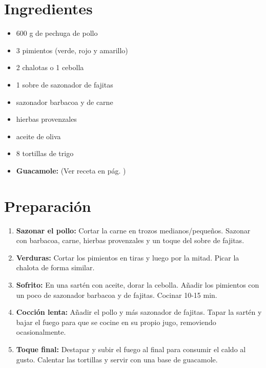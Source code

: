     
    \begin{minipage}[t]{0.35\textwidth}
        \section*{Ingredientes}
        \begin{itemize}[leftmargin=*]
            \raggedright
            \item 600 g de pechuga de pollo
            \item 3 pimientos (verde, rojo y amarillo)
            \item 2 chalotas o 1 cebolla
            \item 1 sobre de sazonador de fajitas
            \item sazonador barbacoa y de carne
            \item hierbas provenzales
            \item aceite de oliva
            \item 8 tortillas de trigo
            \item \textbf{Guacamole:} (Ver receta en pág. \pageref{receta:guacamole})
        \end{itemize}
    \end{minipage}
    \hfill
    \begin{minipage}[t]{0.6\textwidth}
        \section*{Preparación}
        \begin{enumerate}
            \item \textbf{Sazonar el pollo:} Cortar la carne en trozos medianos/pequeños. Sazonar con barbacoa, carne, hierbas provenzales y un toque del sobre de fajitas.
            \item \textbf{Verduras:} Cortar los pimientos en tiras y luego por la mitad. Picar la chalota de forma similar.
            \item \textbf{Sofrito:} En una sartén con aceite, dorar la cebolla. Añadir los pimientos con un poco de sazonador barbacoa y de fajitas. Cocinar 10-15 min.
            \item \textbf{Cocción lenta:} Añadir el pollo y más sazonador de fajitas. Tapar la sartén y bajar el fuego para que se cocine en su propio jugo, removiendo ocasionalmente.
            \item \textbf{Toque final:} Destapar y subir el fuego al final para consumir el caldo al gusto. Calentar las tortillas y servir con una base de guacamole.
        \end{enumerate}
    \end{minipage}

